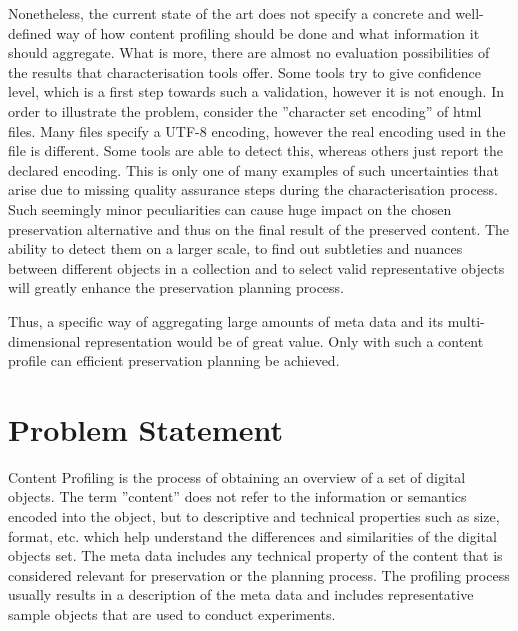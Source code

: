 Nonetheless, the current state of the art does not specify a concrete and well-defined way of how content profiling should be done and what information it should aggregate. What is more, there are almost no evaluation possibilities of the results that characterisation tools offer. Some tools try to give confidence level, which is a first step towards such a validation, however it is not enough. In order to illustrate the problem, consider the ''character set encoding'' of html files. Many files specify a UTF-8 encoding, however the real encoding used in the file is different. Some tools are able to detect this, whereas others just report the declared encoding. This is only one of many examples of such uncertainties that arise due to missing quality assurance steps during the characterisation process. Such seemingly minor peculiarities can cause huge impact on the chosen preservation alternative and thus on the final result of the preserved content. The ability to detect them on a larger scale, to find out subtleties and nuances between different objects in a collection and to select valid representative objects will greatly enhance the preservation planning process.

Thus, a specific way of aggregating large amounts of meta data and its multi-dimensional representation would be of great value. Only with such a content profile can efficient preservation planning be achieved.

\section{Problem Statement}
\label{sec:problem_statement}
Content Profiling is the process of obtaining an overview of a set of digital objects.
The term ''content'' does not refer to the information or semantics encoded into the object, but to descriptive and technical properties such as size, format, etc. which help understand the differences and similarities of the digital objects set.
The meta data includes any technical property of the content that is considered relevant for preservation or the planning process.
The profiling process usually results in a description of the meta data and includes representative sample objects that are used to conduct experiments.

